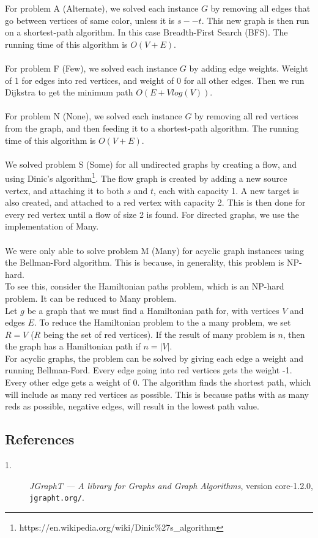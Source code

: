 \documentclass{article}
\begin{document}
For problem A (Alternate), we solved each instance $G$ by removing all edges that go between vertices of same color, unless it is $s -- t$. This new graph is then run on a shortest-path algorithm. In this case Breadth-First Search (BFS).
The running time of this algorithm is $O(V + E)$.\\\\
For problem F (Few), we solved each instance $G$ by adding edge weights. Weight of 1 for edges into red vertices, and weight of 0 for all other edges. Then we run Dijkstra to get the minimum path $O(E + V log(V))$.\\\\
For problem N (None), we solved each instance $G$ by removing all red vertices from the graph, and then feeding it to a shortest-path algorithm.
The running time of this algorithm is $O(V + E)$.\\\\
We solved problem S (Some) for all undirected graphs by creating a flow, and using Dinic's algorithm\footnote{https://en.wikipedia.org/wiki/Dinic\%27s_algorithm}. The flow graph is created by adding a new source vertex, and attaching it to both $s$ and $t$, each with capacity 1. A new target is also created, and attached to a red vertex with capacity 2. This is then done for every red vertex until a flow of size 2 is found. For directed graphs, we use the implementation of Many.\\\\
We were only able to solve problem M (Many) for acyclic graph instances using the Bellman-Ford algorithm. This is because, in generality, this problem is NP-hard.\\
To see this, consider the Hamiltonian paths problem, which is an NP-hard problem. It can be reduced to Many problem.\\
Let $g$ be a graph that we must find a Hamiltonian path for, with vertices $V$ and edges $E$. To reduce the Hamiltonian problem to the a many problem, we set $R = V$ ($R$ being the set of red vertices). If the result of many problem is $n$, then the graph has a Hamiltonian path if $n = |V|$.\\
For acyclic graphs, the problem can be solved by giving each edge a weight and running Bellman-Ford. Every edge going into red vertices gets the weight -1. Every other edge gets a weight of 0. The algorithm finds the shortest path, which will include as many red vertices as possible. This is because paths with as many reds as possible, negative edges, will result in the lowest path value.

\subsection{References}
\begin{description}
  \item[1.] \emph{JGraphT --- A library for Graphs and Graph Algorithms}, version core-1.2.0, {\tt jgrapht.org/}.
\end{description}
\end{document}
